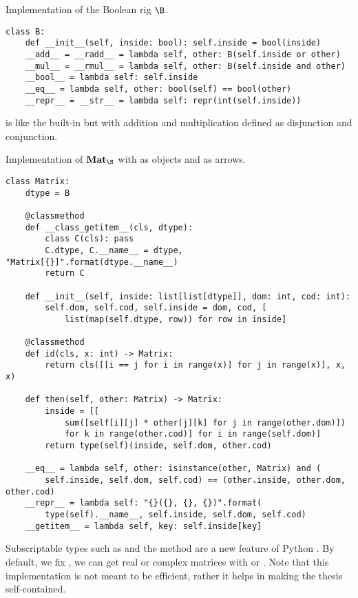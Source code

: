 \begin{python}
{\normalfont Implementation of the Boolean rig $\B$.}

\begin{verbatim}
class B:
    def __init__(self, inside: bool): self.inside = bool(inside)
    __add__ = __radd__ = lambda self, other: B(self.inside or other)
    __mul__ = __rmul__ = lambda self, other: B(self.inside and other)
    __bool__ = lambda self: self.inside
    __eq__ = lambda self, other: bool(self) == bool(other)
    __repr__ = __str__ = lambda self: repr(int(self.inside))
\end{verbatim}

 is like the built-in  but with addition and multiplication defined as disjunction and conjunction.
\end{python}

\begin{python}
{\normalfont Implementation of $\mathbf{Mat}_\S$ with  as objects and  as arrows.}

\begin{verbatim}
class Matrix:
    dtype = B

    @classmethod
    def __class_getitem__(cls, dtype):
        class C(cls): pass
        C.dtype, C.__name__ = dtype, "Matrix[{}]".format(dtype.__name__)
        return C

    def __init__(self, inside: list[list[dtype]], dom: int, cod: int):
        self.dom, self.cod, self.inside = dom, cod, [
            list(map(self.dtype, row)) for row in inside]

    @classmethod
    def id(cls, x: int) -> Matrix:
        return cls([[i == j for i in range(x)] for j in range(x)], x, x)

    def then(self, other: Matrix) -> Matrix:
        inside = [[
            sum([self[i][j] * other[j][k] for j in range(other.dom)])
            for k in range(other.cod)] for i in range(self.dom)]
        return type(self)(inside, self.dom, other.cod)

    __eq__ = lambda self, other: isinstance(other, Matrix) and (
        self.inside, self.dom, self.cod) == (other.inside, other.dom, other.cod)
    __repr__ = lambda self: "{}({}, {}, {})".format(
        type(self).__name__, self.inside, self.dom, self.cod)
    __getitem__ = lambda self, key: self.inside[key]
\end{verbatim}

Subscriptable types such as  and the  method are a new feature of Python .
By default, we fix , we can get real or complex matrices with  or .
Note that this implementation is not meant to be efficient, rather it helps in making the thesis self-contained.
\end{python}

